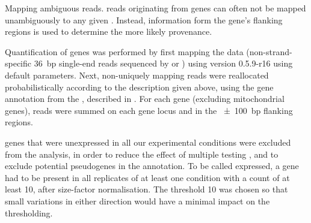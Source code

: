     {Mapping ambiguous \chip reads.}
    {\chip reads originating from \trna genes can often not be mapped
    unambiguously to any given \trna. Instead, information form the gene’s
    flanking regions is used to determine the more likely provenance.}

Quantification of \trna genes was performed by first mapping the  \chipseq
data (non-strand-specific \SI{36}{bp} single-end reads sequenced by
  or ) using
 version 0.5.9-r16 \citep{Li:2009a} using default parameters. Next,
non-uniquely mapping reads were reallocated probabilistically according to the
description given above, using the \trna gene annotation from the , described in \citet{Chan:2009}. For each \trna gene (excluding
mitochondrial \trna genes), reads were summed on each \trna gene locus and in
the \SI{\pm100}{bp} flanking regions.

\trna genes that were unexpressed in all our experimental conditions were
excluded from the analysis, in order to reduce the effect of multiple testing
\citep{Bourgon:2010}, and to exclude potential pseudogenes in the annotation. To
be called expressed, a \trna gene had to be present in all replicates of at
least one condition with a count of at least \num{10}, after size-factor
normalisation. The threshold \num{10} was chosen so that small variations in
either direction would have a minimal impact on the thresholding.

%
%
%
